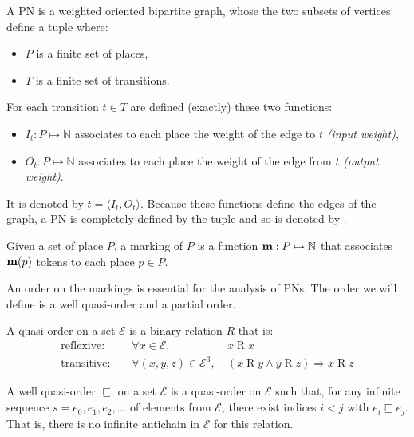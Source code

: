 \begin{defi}[\acl{PN}]
  A \acf{PN} \tupleN is a weighted oriented bipartite graph, whose the two subsets of vertices define a tuple \PT where:
  \begin{itemize}
    \item $P$ is a finite set of places,
    \item $T$ is a finite set of transitions.
  \end{itemize}
  For each transition $t \in T$ are defined (exactly) these two functions:
  \begin{itemize}
    \item $I_t : P \mapsto \mathbb{N}$ associates to each place the weight of the edge to $t$ \emph{(input weight)},
    \item $O_t : P \mapsto \mathbb{N}$ associates to each place the weight of the edge from $t$ \emph{(output weight)}.
  \end{itemize}
  It is denoted by $t = \langle I_t, O_t \rangle$.
  Because these functions define the edges of the graph, a \ac{PN} is completely defined by the tuple \PT and so is denoted by \NPT.
\end{defi}

\begin{defi}[marking]
  Given a set of place $P$, a marking of $P$ is a function $\mathbf{m} : P \mapsto \mathbb{N}$ that associates $\mathbf{m}(p)$ tokens to each place $p \in P$.
\end{defi}

An order on the markings is essential for the analysis of \acp{PN}. The order we will define is a well quasi-order and a partial order.

\begin{defi}
  A quasi-order on a set $\mathcal{E}$ is a binary relation $R$ that is:
  \begin{align*}
    \text{reflexive: } &&\forall x \in \mathcal{E},\ & x \mathrel{R} x \\
    \text{transitive: } &&\forall (x, y, z) \in \mathcal{E}^3,\ & (x \mathrel{R} y\land y \mathrel{R} z)\Rightarrow x \mathrel{R} z
  \end{align*}
\end{defi}

\begin{defi}
  A well quasi-order $\sqsubseteq$ on a set $\mathcal{E}$ is a quasi-order on $\mathcal{E}$ such that, for any infinite sequence $s = e_0, e_1, e_2, \dots$ of elements from $\mathcal{E}$, there exist indices $i < j$ with $e_i \sqsubseteq e_j$. That is, there is no infinite antichain in $\mathcal{E}$ for this relation.
\end{defi}


